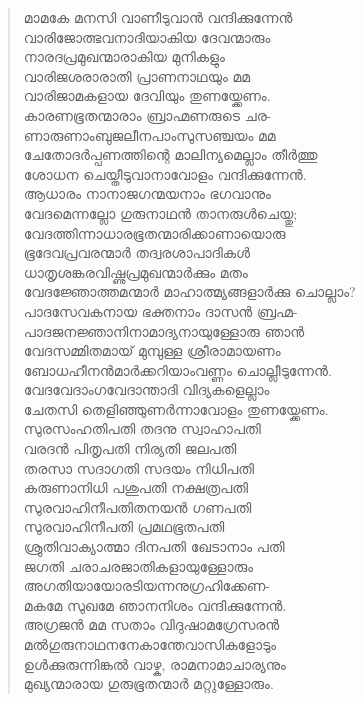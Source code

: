 \begin{verse}
മാമകേ മനസി വാണീടുവാന്‍ വന്ദിക്കുന്നേന്‍\\
വാരിജോത്ഭവനാദിയാകിയ ദേവന്മാരും\\
നാരദപ്രമുഖന്മാരാകിയ മുനികളും\\
വാരിജശരാരാതി പ്രാണനാഥയും മമ\\
വാരിജാമകളായ ദേവിയും തുണയ്ക്കേണം.\\
കാരണഭൂതന്മാരാം ബ്രാഹ്മണരുടെ ചര-\\
ണാരുണാംബുജലീനപാംസുസഞ്ചയം മമ\\
ചേതോദര്‍പ്പണത്തിന്റെ മാലിന്യമെല്ലാം തീര്‍ത്തു\\
ശോധന ചെയ്തീടുവാനാവോളം വന്ദിക്കുന്നേന്‍.\\
ആധാരം നാനാജഗന്മയനാം ഭഗവാനും\\
വേദമെന്നല്ലോ ഗുരുനാഥന്‍ താനരുള്‍ചെയ്തു;\\
വേദത്തിന്നാധാരഭൂതന്മാരിക്കാണായൊരു\\
ഭൂദേവപ്രവരന്മാര്‍ തദ്വരശാപാദികള്‍\\
ധാതൃശങ്കരവിഷ്ണുപ്രമുഖന്മാര്‍ക്കും മതം\\
വേദജ്ഞോത്തമന്മാര്‍ മാഹാത്മ്യങ്ങളാര്‍ക്കു ചൊല്ലാം?\\
പാദസേവകനായ ഭക്തനാം ദാസന്‍ ബ്രഹ്മ-\\
പാദജനജ്ഞാനിനാമാദ്യനായുള്ളോരു ഞാന്‍\\
വേദസമ്മിതമായ് മുമ്പുള്ള ശ്രീരാമായണം\\
ബോധഹീനന്‍മാര്‍ക്കറിയാംവണ്ണം ചൊല്ലീടുന്നേന്‍.\\
വേദവേദാംഗവേദാന്താദി വിദ്യകളെല്ലാം\\
ചേതസി തെളിഞ്ഞുണര്‍ന്നാവോളം തുണയ്ക്കേണം.\\
സുരസംഹതിപതി തദനു സ്വാഹാപതി\\
വരദന്‍ പിതൃപതി നിര്യതി ജലപതി\\
തരസാ സദാഗതി സദയം നിധിപതി\\
കരുണാനിധി പശുപതി നക്ഷത്രപതി\\
സുരവാഹിനീപതിതനയന്‍ ഗണപതി\\
സുരവാഹിനീപതി പ്രമഥഭൂതപതി\\
ശ്രുതിവാക്യാത്മാ ദിനപതി ഖേടാനാം പതി\\
ജഗതി ചരാചരജാതികളായുള്ളോരും\\
അഗതിയായോരടിയന്നനുഗ്രഹിക്കേണ-\\
മകമേ സുഖമേ ഞാനനിശം വന്ദിക്കുന്നേന്‍.\\
അഗ്രജന്‍ മമ സതാം വിദുഷാമഗ്രേസരന്‍\\
മല്‍ഗുരുനാഥനനേകാന്തേവാസികളോടും\\
ഉള്‍ക്കുരുന്നിങ്കല്‍ വാഴ്ക, രാമനാമാചാര്യനും\\
മുഖ്യന്മാരായ ഗുരുഭൂതന്മാര്‍ മറ്റുള്ളോരും.\\

\end{verse}
